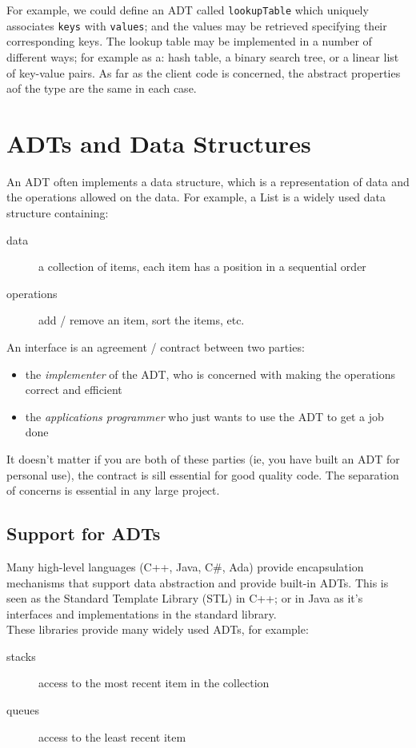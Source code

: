 For example, we could define an ADT called \verb|lookupTable| which uniquely associates \verb|keys| with \verb|values|; and the values may be retrieved specifying their corresponding keys. The lookup table may be implemented in a number of different ways; for example as a: hash table, a binary search tree, or a linear list of key-value pairs. As far as the client code is concerned, the abstract properties aof the type are the same in each case.

\section{ADTs and Data Structures}
An ADT often implements a data structure, which is a representation of data and the operations allowed on the data. For example, a List is a widely used data structure containing:
\begin{description}
    \item[data] a collection of items, each item has a position in a sequential order
    \item[operations] add / remove an item, sort the items, etc. 
\end{description}

An interface is an agreement / contract between two parties:
\begin{itemize}
    \item the \textit{implementer} of the ADT, who is concerned with making the operations correct and efficient
    \item the \textit{applications programmer} who just wants to use the ADT to get a job done
\end{itemize}
It doesn't matter if you are both of these parties (ie, you have built an ADT for personal use), the contract is sill essential for good quality code. The separation of concerns is essential in any large project.

\subsection{Support for ADTs}
Many high-level languages (C++, Java, C\#, Ada) provide encapsulation mechanisms that support data abstraction and provide built-in ADTs. This is seen as the Standard Template Library (STL) in C++; or in Java as it's interfaces and implementations in the standard library.\\

These libraries provide many widely used ADTs, for example:
\begin{description}
    \item[stacks] access to the most recent item in the collection
    \item[queues] access to the least recent item
\end{description}

